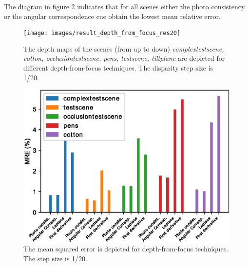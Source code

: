 \documentclass  [
  paper    = a4,
  BCOR     = 10mm,
  twoside,
  fontsize = 12pt,
  fleqn,
  toc      = bibnumbered,
  toc      = listofnumbered,
  numbers  = noendperiod,
  headings = normal,
  listof   = leveldown,
  version  = 3.03
]                                       {scrreprt}
\begin{document}
	The diagram in figure \ref{fig:errorres20all} indicates that for all scenes either the photo consistency or the angular correspondence cue obtain the lowest mean relative error.	
	\begin{figure}[h!]
		\centering
		\texttt{[image: images/result\_depth\_from\_focus\_res20]}
		\caption[Depth from focus: Depth maps]{The depth maps of the scenes (from up to down) \textit{complextestscene, cotton, occlusiontestscene, pens, testscene, tiltplane} are depicted for different depth-from-focus techniques. The disparity step size is 1/20.}
		\label{fig:resultdepthfromfocus}
	\end{figure}
	\begin{figure}[h!]
		\centering
		\includegraphics[width=0.7\linewidth]{images/error_res20_all}
		\caption[Mean squared error for depth-from-focus techniques]{The mean squared error is depicted for depth-from-focus techniques. The step size is 1/20.}
		\label{fig:errorres20all}
	\end{figure}
\end{document}
